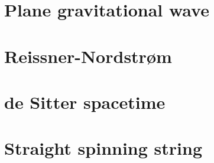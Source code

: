 \documentclass[10pt,twoside,notitlepage,a4paper,fleqn,openbib]{report}
\begin{document}

\clearpage
\section{Plane gravitational wave}
\setcounter{equation}{0}

\clearpage
\section{Reissner-Nordstr{\o}m}
\setcounter{equation}{0}

\clearpage
\section{de Sitter spacetime}
\setcounter{equation}{0}

\clearpage
\section{Straight spinning string}
\setcounter{equation}{0}

\clearpage
\end{document}
